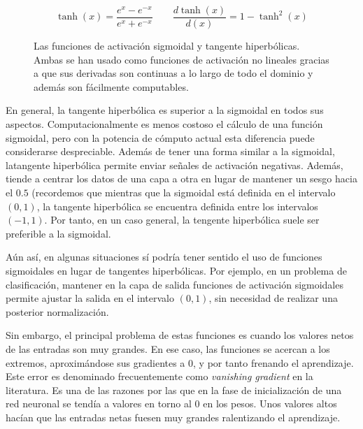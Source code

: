 \begin{equation}
\tanh(x) = \frac{e^x - e^{-x}}{e^x+e^{-x}} \qquad
\frac{d\tanh (x)}{d(x)} = 1 - \tanh^2(x)
\label{eq:tanh}
\end{equation}

\begin{figure}[!b]
	\centering
	\qquad
	\caption[Funciones de activación: sigmoidal y tangente hiperbólica.]{Las funciones de activación sigmoidal y tangente hiperbólicas. Ambas se han usado como funciones de activación no lineales gracias a que sus derivadas son continuas a lo largo de todo el dominio y además son fácilmente computables.}
	\label{fig:sig-and-tanh}
\end{figure}

En general, la tangente hiperbólica es superior a la sigmoidal en todos sus aspectos. Computacionalmente es menos costoso el cálculo de una función sigmoidal, pero con la potencia de cómputo actual esta diferencia puede considerarse despreciable. Además de tener una forma similar a la sigmoidal, latangente hiperbólica permite enviar señales de activación negativas. Además, tiende a centrar los datos de una capa a otra en lugar de mantener un sesgo hacia el $0.5$ (recordemos que mientras que la sigmoidal está definida en el intervalo $(0, 1)$, la tangente hiperbólica se encuentra definida entre los intervalos $(-1, 1)$. Por tanto, en un caso general, la tengente hiperbólica suele ser preferible a la sigmoidal.

Aún así, en algunas situaciones sí podría tener sentido el uso de funciones sigmoidales en lugar de tangentes hiperbólicas. Por ejemplo, en un problema de clasificación, mantener en la capa de salida funciones de activación sigmoidales permite ajustar la salida en el intervalo $(0, 1)$, sin necesidad de realizar una posterior normalización.

Sin embargo, el principal problema de estas funciones es cuando los valores netos de las entradas son muy grandes. En ese caso, las funciones se acercan a los extremos, aproximándose sus gradientes a 0, y por tanto frenando el aprendizaje. Este error es denominado frecuentemente como \textit{vanishing gradient} en la literatura. Es una de las razones por las que en la fase de inicialización de una red neuronal se tendía a valores en torno al 0 en los pesos. Unos valores altos hacían que las entradas netas fuesen muy grandes ralentizando el aprendizaje.


